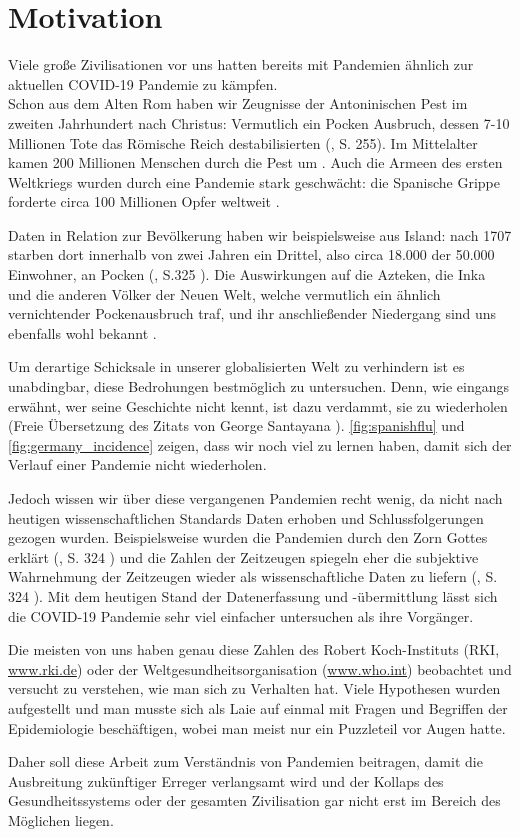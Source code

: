 \chapter{Motivation}\label{chap:Motivation}
Viele große Zivilisationen vor uns hatten bereits mit Pandemien ähnlich zur aktuellen COVID-19 Pandemie zu kämpfen.\\
Schon aus dem Alten Rom haben wir Zeugnisse der Antoninischen Pest im zweiten Jahrhundert nach Christus: Vermutlich ein Pocken Ausbruch, dessen 7-10 Millionen Tote das Römische Reich destabilisierten (\autocite{RomPest}, S. 255).
Im Mittelalter kamen 200 Millionen Menschen durch die Pest um \autocite{PestMittelalter}.
Auch die Armeen des ersten Weltkriegs wurden durch eine Pandemie stark geschwächt: die Spanische Grippe forderte circa 100 Millionen Opfer weltweit \autocite{SpanischeGrippe}.

Daten in Relation zur Bevölkerung haben wir beispielsweise aus Island: nach 1707 starben dort innerhalb von zwei Jahren ein Drittel, also circa  18.000 der 50.000 Einwohner, an Pocken (\autocite{americaPandemics}, S.325%
). Die Auswirkungen auf die Azteken, die Inka und die anderen Völker der Neuen Welt, welche vermutlich ein ähnlich vernichtender Pockenausbruch traf, und ihr anschließender Niedergang sind uns ebenfalls wohl bekannt \autocite{americaPandemics}.

Um derartige Schicksale in unserer globalisierten Welt zu verhindern ist es unabdingbar, diese Bedrohungen bestmöglich zu untersuchen. Denn, wie eingangs erwähnt, \glqq{}wer seine Geschichte nicht kennt, ist dazu verdammt, sie zu wiederholen\grqq{} (Freie Übersetzung des Zitats von George Santayana \autocite{history-quoteSantayana}).
\autoref{fig:spanishflu} und \autoref{fig:germany_incidence} zeigen, dass wir noch viel zu lernen haben, damit sich der Verlauf einer Pandemie nicht wiederholen.


Jedoch wissen wir über diese vergangenen Pandemien recht wenig, da nicht nach heutigen wissenschaftlichen Standards Daten erhoben und Schlussfolgerungen gezogen wurden. Beispielsweise wurden die Pandemien durch den Zorn Gottes erklärt (\autocite{americaPandemics}, S. 324%
) und die Zahlen der Zeitzeugen spiegeln eher die subjektive Wahrnehmung der Zeitzeugen wieder als wissenschaftliche Daten zu liefern (\autocite{americaPandemics}, S. 324%
). Mit dem heutigen Stand der Datenerfassung und -übermittlung lässt sich die COVID-19 Pandemie sehr viel einfacher untersuchen als ihre Vorgänger.

Die meisten von uns haben genau diese Zahlen des Robert Koch-Instituts (RKI, \href{www.rki.de}{www.rki.de}) oder der Weltgesundheitsorganisation (\href{www.who.int}{www.who.int}) beobachtet und versucht zu verstehen, wie man sich zu Verhalten hat. Viele Hypothesen wurden aufgestellt und man musste sich als Laie auf einmal mit Fragen und Begriffen der Epidemiologie beschäftigen, wobei man meist nur ein Puzzleteil vor Augen hatte.

Daher soll diese Arbeit zum Verständnis von Pandemien beitragen, damit die Ausbreitung zukünftiger Erreger verlangsamt wird und der Kollaps des Gesundheitssystems oder der gesamten Zivilisation gar nicht erst im Bereich des Möglichen liegen.